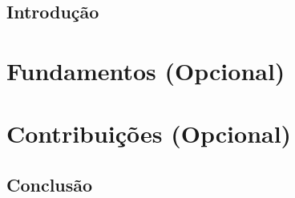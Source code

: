 \textual


\chapter{Introdu\c{c}\~{a}o}
\label{cap:intro}
\lipsum[1-4]    %


\part{Fundamentos (Opcional)}



\part{Contribui\c{c}\~{o}es (Opcional)}



%

\chapter*[Conclus\~{a}o]{Conclus\~{a}o}
\lipsum[1-5]

\postextual




%
%
%
%
%

